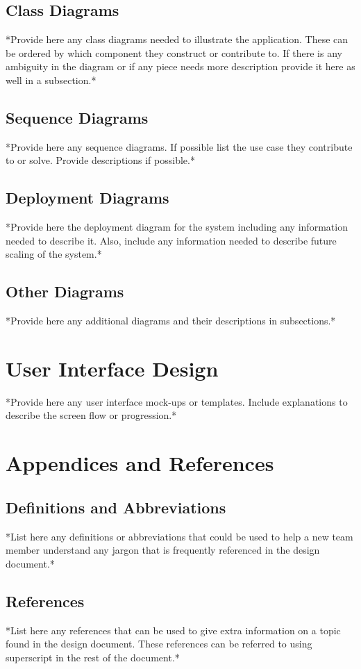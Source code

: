 \documentclass{article}
\begin{document}
\subsection{Class Diagrams}

*Provide here any class diagrams needed to illustrate the application. These
can be ordered by which component they construct or contribute to. If there is
any ambiguity in the diagram or if any piece needs more description provide it
here as well in a subsection.*

\subsection{Sequence Diagrams}

*Provide here any sequence diagrams. If possible list the use case they
contribute to or solve. Provide descriptions if possible.*

\subsection{Deployment Diagrams}

*Provide here the deployment diagram for the system including any information
needed to describe it. Also, include any information needed to describe future
scaling of the system.*

\subsection{Other Diagrams}

*Provide here any additional diagrams and their descriptions in subsections.*

\section{User Interface Design}

*Provide here any user interface mock-ups or templates. Include explanations to
describe the screen flow or progression.*


\section{Appendices and References}

\subsection{Definitions and Abbreviations}

*List here any definitions or abbreviations that could be used to help a new
team member understand any jargon that is frequently referenced in the design
document.*

\subsection{References}

*List here any references that can be used to give extra information on a topic
found in the design document. These references can be referred to using
superscript in the rest of the document.*
\end{document}
